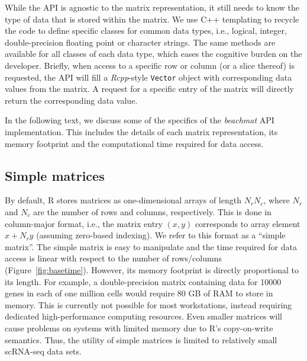 \documentclass[10pt,letterpaper]{article}
\newcommand{\beachmat}{\textit{beachmat}}
\newcommand{\code}[1]{\texttt{#1}}
\begin{document}
While the API is agnostic to the matrix representation, it still needs to know the type of data that is stored within the matrix.
We use C++ templating to recycle the code to define specific classes for common data types, i.e., logical, integer, double-precision floating point or character strings.
The same methods are available for all classes of each data type, which eases the cognitive burden on the developer.
Briefly, when access to a specific row or column (or a slice thereof) is requested, the API will fill a \textit{Rcpp}-style \code{Vector} object with corresponding data values from the matrix.
A request for a specific entry of the matrix will directly return the corresponding data value.

In the following text, we discuss some of the specifics of the \beachmat{} API implementation.
This includes the details of each matrix representation, its memory footprint and the computational time required for data access.

\subsection*{Simple matrices}
By default, R stores matrices as one-dimensional arrays of length $N_rN_c$, where $N_r$ and $N_c$ are the number of rows and columns, respectively.
This is done in column-major format, i.e., the matrix entry $(x, y)$ corresponds to array element $x + N_ry$ (assuming zero-based indexing).
We refer to this format as a ``simple matrix''.
The simple matrix is easy to manipulate and the time required for data access is linear with respect to the number of rows/columns (Figure~\ref{fig:basetime}).
However, its memory footprint is directly proportional to its length.
For example, a double-precision matrix containing data for 10000 genes in each of one million cells would require 80 GB of RAM to store in memory.
This is currently not possible for most workstations, instead requiring dedicated high-performance computing resources.
Even smaller matrices will cause problems on systems with limited memory due to R's copy-on-write semantics.
Thus, the utility of simple matrices is limited to relatively small scRNA-seq data sets.

\end{document}
